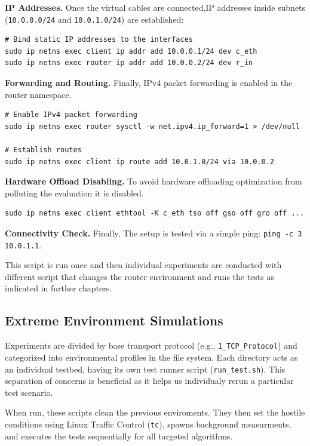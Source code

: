 \documentclass[12pt,a4paper]{article}
\begin{document}
\textbf{IP Addresses.}  Once the virtual cables are connected,IP addresses inside subnets (\texttt{10.0.0.0/24} and \texttt{10.0.1.0/24}) are established:

\begin{verbatim}
# Bind static IP addresses to the interfaces
sudo ip netns exec client ip addr add 10.0.0.1/24 dev c_eth
sudo ip netns exec router ip addr add 10.0.0.2/24 dev r_in
\end{verbatim}

\textbf{Forwarding and Routing.} Finally, IPv4 packet forwarding is enabled in the router namespace. 

\begin{verbatim}
# Enable IPv4 packet forwarding
sudo ip netns exec router sysctl -w net.ipv4.ip_forward=1 > /dev/null

# Establish routes
sudo ip netns exec client ip route add 10.0.1.0/24 via 10.0.0.2
\end{verbatim}

\textbf{Hardware Offload Disabling.} To avoid hardware offloading optimization from polluting the evaluation it is disabled.

\begin{verbatim}
sudo ip netns exec client ethtool -K c_eth tso off gso off gro off ...
\end{verbatim}

\textbf{Connectivity Check.} Finally, The setup is tested via a simple ping: \texttt{ping -c 3 10.0.1.1}.

This script is run once and then individual experiments are conducted with different script that changes the router environment and runs the tests as indicated in further chapters.

\subsection{Extreme Environment Simulations}

Experiments are divided by base transport protocol (e.g., \texttt{1\_TCP\_Protocol}) and  categorized into environmental profiles in the file system. Each directory acts as an individual testbed, having its own test runner script (\texttt{run\_test.sh}). This separation of concerns is beneficial as it helps us individualy rerun a particular test scenario.

When run, these scripts clean the previous enviroments. They then set the hostile conditions using Linux Traffic Control (\texttt{tc}), spawns background measurments, and executes the tests sequentially for all targeted algorithms. 
\end{document}
